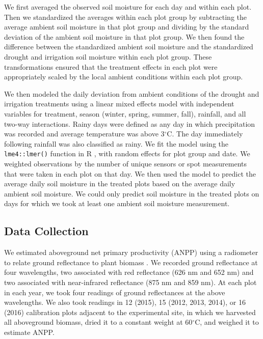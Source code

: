 \documentclass[fleqn,10pt,lineno]{wlpeerj} %
\begin{document}
We first averaged the observed soil moisture for each day and within
each plot. Then we standardized the averages within each plot group by
subtracting the average ambient soil moisture in that plot group and
dividing by the standard deviation of the ambient soil moisture in that
plot group. We then found the difference between the standardized
ambient soil moisture and the standardized drought and irrigation soil
moisture within each plot group. These transformations ensured that the
treatment effects in each plot were appropriately scaled by the local
ambient conditions within each plot group.

We then modeled the daily deviation from ambient conditions of the
drought and irrigation treatments using a linear mixed effects model
with independent variables for treatment, season (winter, spring,
summer, fall), rainfall, and all two-way interactions. Rainy days were
defined as any day in which precipitation was recorded and average
temperature was above 3\(^{\circ}\)C. The day immediately following
rainfall was also classified as rainy. We fit the model using the
\texttt{lme4::lmer()} function \citep{Bates2015} in R \citep{R2016},
with random effects for plot group and date. We weighted observations by
the number of unique sensors or spot measurements that were taken in
each plot on that day. We then used the model to predict the average
daily soil moisture in the treated plots based on the average daily
ambient soil moisture. We could only predict soil moisture in the
treated plots on days for which we took at least one ambient soil
moisture measurement.

\subsection{Data Collection}\label{data-collection}

We estimated aboveground net primary productivity (ANPP) using a
radiometer to relate ground reflectance to plant biomass \citep[see][
for a review]{Byrne2011}. We recorded ground reflectance at four
wavelengths, two associated with red reflectance (626 nm and 652 nm) and
two associated with near-infrared reflectance (875 nm and 859 nm). At
each plot in each year, we took four readings of ground reflectances at
the above wavelengths. We also took readings in 12 (2015), 15 (2012,
2013, 2014), or 16 (2016) calibration plots adjacent to the experimental
site, in which we harvested all aboveground biomass, dried it to a
constant weight at 60\(^{\circ}\)C, and weighed it to estimate ANPP.
\end{document}
